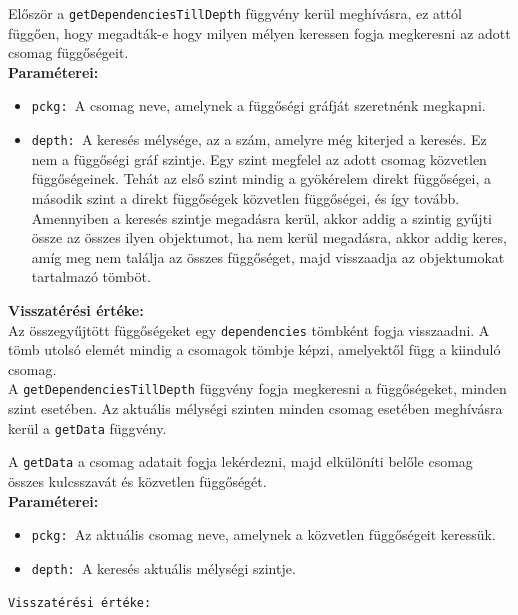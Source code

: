 Először a \texttt{getDependenciesTillDepth} függvény kerül meghívásra, ez attól függően, hogy megadták-e hogy milyen mélyen keressen fogja megkeresni az adott csomag függőségeit.\\

\noindent \textbf{Paraméterei:}

\begin{itemize}
	\item \texttt{pckg: }A csomag neve, amelynek a függőségi gráfját szeretnénk megkapni.
	\item \texttt{depth: }A keresés mélysége, az a szám, amelyre még kiterjed a keresés. Ez nem a függőségi gráf szintje. Egy szint megfelel az adott csomag közvetlen függőségeinek. Tehát az első szint mindig a gyökérelem direkt függőségei, a második szint a direkt függőségek közvetlen függőségei, és így tovább.	Amennyiben a keresés szintje megadásra kerül, akkor addig a szintig gyűjti össze az összes ilyen objektumot, ha nem kerül megadásra, akkor addig keres, amíg meg nem találja az összes függőséget, majd visszaadja az objektumokat tartalmazó tömböt.
\end{itemize}

\noindent \textbf{Visszatérési értéke:} \\

Az összegyűjtött függőségeket egy \texttt{dependencies} tömbként fogja visszaadni. A tömb utolsó elemét mindig a csomagok tömbje képzi, amelyektől függ a kiinduló csomag.\\

A \texttt{getDependenciesTillDepth} függvény fogja megkeresni a függőségeket, minden szint esetében. Az aktuális mélységi szinten minden csomag esetében meghívásra kerül a \texttt{getData} függvény.
\pagebreak

A \texttt{getData} a csomag adatait fogja lekérdezni, majd elkülöníti belőle csomag összes kulcsszavát és közvetlen függőségét.\\ 

\noindent \textbf{Paraméterei:}

\begin{itemize}
	\item \texttt{pckg: }Az aktuális csomag neve, amelynek a közvetlen függőségeit keressük.
	\item \texttt{depth: }A keresés aktuális mélységi szintje.
\end{itemize}

\noindent \texttt{Visszatérési értéke:} \\

